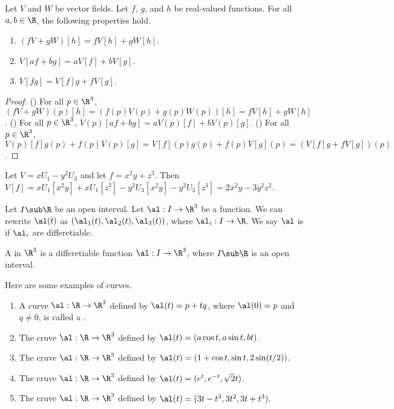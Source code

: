 \documentclass[12pt]{article}
\begin{document}
\begin{proposition}
    Let $V$ and $W$ be vector fields. Let $f$, $g$, and $h$ be real-valued functions. For all $a,b\in\R$, the following properties hold.
    \begin{enumerate}
        \item $(fV+gW)[h]=fV[h]+gW[h]$.
        \item $V[af+bg]=aV[f]+bV[g]$.
        \item $V[fg]=V[f]g+fV[g]$.
    \end{enumerate}
\end{proposition}
\begin{proof}
    () For all $p\in{\R}^{3}$, $(fV+gW)(p)[h]=(f(p)V(p)+g(p)W(p))[h]=fV[h]+gW[h]$. () For all $p\in{\R}^{3}$, $V(p)[af+bg]=aV(p)[f]+bV(p)[g]$. () For all $p\in{\R}^{3}$, $V(p)[f]g(p)+f(p)V(p)[g]=V[f](p)g(p)+f(p)V[g](p)=(V[f]g+fV[g])(p)$.
\end{proof}
\begin{example}
    Let $V=x{U}_{1}-{y}^{2}{U}_{3}$ and let $f={x}^{2}y+{z}^{3}$. Then $V[f]=x{U}_{1}[{x}^{2}y]+x{U}_{1}[{z}^{3}]-{y}^{2}{U}_{3}[{x}^{2}y]-{y}^{2}{U}_{3}[{z}^{3}]=2{x}^{2}y-3{y}^{2}{z}^{2}$.
\end{example}
\par
Let $I\sub\R$ be an open interval. Let $\al:I\to{\R}^{3}$ be a function. We can rewrite $\al(t)$ as $({\al}_{1}(t),{\al}_{2}(t),{\al}_{3}(t))$, where ${\al}_{i}:I\to\R$. We say $\al$ is  if ${\al}_{i}$ are differetiable.
\begin{definition}
    A  in ${\R}^{3}$ is a differetiable function $\al:I\to{\R}^{3}$, where $I\sub\R$ is an open interval.
\end{definition}
\begin{example}
    Here are some examples of curves.
    \begin{enumerate}
        \item A curve $\al:\R\to{\R}^{3}$ defined by $\al(t)=p+tq$, where $\al(0)=p$ and $q\ne 0$, is called a .
        \item The cruve $\al:\R\to{\R}^{3}$ defined by $\al(t)=(a\cos t,a\sin t,bt)$.
        \item The cruve $\al:\R\to{\R}^{3}$ defined by $\al(t)=(1+\cos t,\sin t,2\sin(t/2))$.
        \item The cruve $\al:\R\to{\R}^{3}$ defined by $\al(t)=({e}^{t},{e}^{-t},\sqrt{2}t)$.
        \item The cruve $\al:\R\to{\R}^{3}$ defined by $\al(t)=(3t-{t}^{3},3{t}^{2},3t+{t}^{3})$.
    \end{enumerate}
\end{example}
\end{document}
